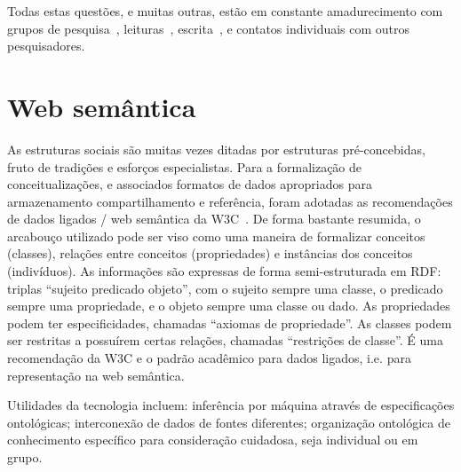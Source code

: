 \documentclass[a4paper,openright,12pt]{report} %
\begin{document}

Todas estas questões, e muitas outras, estão em constante amadurecimento com grupos de pesquisa~\cite{nexos}, 
leituras~\cite{massimoTexto}, escrita~\cite{ensaio,anPhy}, e contatos individuais com outros pesquisadores.

\section{Web semântica}\label{sec:web}
As estruturas sociais são muitas vezes ditadas por estruturas
pré-concebidas, fruto de tradições e esforços especialistas.
Para a formalização de conceitualizações, e associados
formatos de dados apropriados para armazenamento
compartilhamento e referência,
foram adotadas as recomendações de dados ligados / web semântica
da W3C~\cite{rdf,owl}.
De forma bastante resumida, o arcabouço utilizado pode
ser viso como uma maneira de formalizar conceitos (classes), relações
entre conceitos (propriedades) e instâncias dos conceitos (indivíduos).
As informações são expressas de forma semi-estruturada em RDF:
triplas ``sujeito predicado objeto'',
com o sujeito sempre uma classe, o predicado sempre uma propriedade,
e o objeto sempre uma classe ou dado. As propriedades podem ter especificidades, chamadas ``axiomas de propriedade''. As classes podem ser restritas a possuírem certas relações, chamadas ``restrições de classe''.
É uma recomendação da W3C e o padrão acadêmico para dados ligados, i.e. para representação na web semântica.

Utilidades da tecnologia incluem:
    inferência por máquina através de especificações ontológicas;
    interconexão de dados de fontes diferentes;
    organização ontológica de conhecimento específico para consideração cuidadosa, seja individual ou em grupo.
\end{document}
